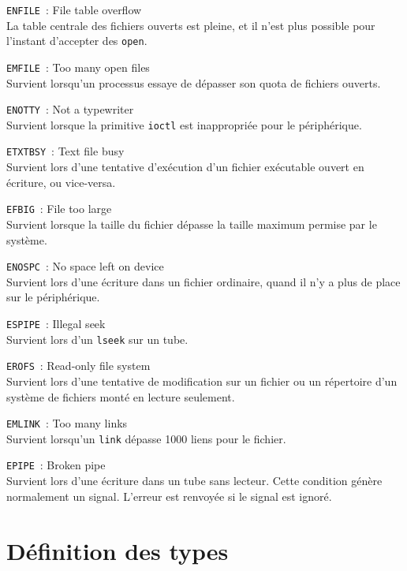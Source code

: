 \documentclass [twoside] {report}
\begin{document}
\texttt {ENFILE}~: File table overflow \\
La table centrale des fichiers ouverts est
pleine, et il n'est plus possible pour l'instant
d'accepter des \texttt {open}.

\texttt {EMFILE}~: Too many open files \\
Survient lorsqu'un processus essaye de dépasser
son quota de fichiers ouverts.

\texttt {ENOTTY}~: Not a typewriter \\
Survient lorsque la primitive \texttt {ioctl} est
inappropriée pour le périphérique.

\texttt {ETXTBSY}~: Text file busy \\
Survient lors d'une tentative d'exécution d'un
fichier exécutable ouvert en écriture, ou
vice-versa.

\texttt {EFBIG}~: File too large \\
Survient lorsque la taille du fichier dépasse la
taille maximum permise par le système.

\texttt {ENOSPC}~: No space left on device \\
Survient lors d'une écriture dans un fichier
ordinaire, quand il n'y a plus de place sur le
périphérique.

\texttt {ESPIPE}~: Illegal seek \\
Survient lors d'un \texttt {lseek} sur un tube.

\texttt {EROFS}~: Read-only file system \\
Survient lors d'une tentative de modification sur
un fichier ou un répertoire d'un système de
fichiers monté en lecture seulement.

\texttt {EMLINK}~: Too many links \\
Survient lorsqu'un \texttt {link} dépasse 1000 liens
pour le fichier.

\texttt {EPIPE}~: Broken pipe \\
Survient lors d'une écriture dans un tube sans
lecteur. Cette condition génère normalement un
signal. L'erreur est renvoyée si le signal est
ignoré.




\section {Définition des types}
\end{document}
